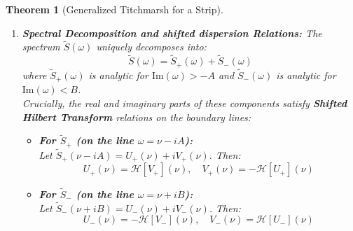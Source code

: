 \documentclass[a4paper,11pt]{article}
\newtheorem{theorem}{Theorem}
\theoremstyle{definition}
\begin{document}
\begin{theorem}[Generalized Titchmarsh for a Strip]
\begin{enumerate}
    \item \textbf{Spectral Decomposition and shifted dispersion Relations:}
    The spectrum $\tilde{S}(\omega)$ uniquely decomposes into:
    \begin{equation}
        \tilde{S}(\omega) = \tilde{S}_+(\omega) + \tilde{S}_-(\omega)
    \end{equation}
    where $\tilde{S}_+(\omega)$ is analytic for $\text{Im}(\omega) > -A$ and $\tilde{S}_-(\omega)$ is analytic for $\text{Im}(\omega) < B$. \\
    
    Crucially, the real and imaginary parts of these components satisfy \textbf{Shifted Hilbert Transform} relations on the boundary lines:
    
    \begin{itemize}
        \item \textbf{For $\tilde{S}_+$ (on the line $\omega = \nu - iA$):} \\
        Let $\tilde{S}_+(\nu - iA) = U_+(\nu) + i V_+(\nu)$. Then:
        \begin{equation}
            U_+(\nu) = \mathcal{H}[V_+](\nu), \quad V_+(\nu) = -\mathcal{H}[U_+](\nu)
        \end{equation}
        
        \item \textbf{For $\tilde{S}_-$ (on the line $\omega = \nu + iB$):} \\
        Let $\tilde{S}_-(\nu + iB) = U_-(\nu) + i V_-(\nu)$. Then:
        \begin{equation}
            U_-(\nu) = -\mathcal{H}[V_-](\nu), \quad V_-(\nu) = \mathcal{H}[U_-](\nu)
        \end{equation}
    \end{itemize}
\end{enumerate}
\end{theorem}
\end{document}
